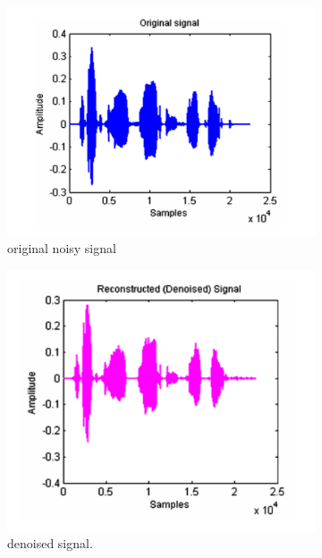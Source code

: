 \documentclass[12pt, a4paper, twoside]{report}
\begin{document}
\begin{figure}[!h]
    \centering
    \begin{subfigure}[b]{0.45\textwidth}
        \includegraphics[width=\textwidth]
        {images/chapter3/comp-noisy-sig}
        \caption{original noisy signal}
        \label{fig:comp-noisy-sig}
    \end{subfigure}
    \hfill
    \begin{subfigure}[b]{0.45\textwidth}
        \includegraphics[width=\textwidth]
        {images/chapter3/comp-denoisy-sig}
        \caption{denoised signal.}
        \label{fig:comp-denoisy-sig}
    \end{subfigure}
    \caption{}
    \label{fig:comp-denoisy-noisy}
\end{figure}
\end{document}
